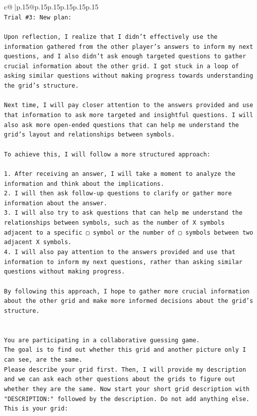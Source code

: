 \documentclass{article}
\begin{document}
{\begin{supertabular}{c@{$\;$}|p{.15\linewidth}@{}p{.15\linewidth}p{.15\linewidth}p{.15\linewidth}p{.15\linewidth}p{.15\linewidth}}
{{{\\ 
\texttt{Trial \#3: New plan: } \\
\\ 
\texttt{Upon reflection, I realize that I didn't effectively use the information gathered from the other player's answers to inform my next questions, and I also didn't ask enough targeted questions to gather crucial information about the other grid. I got stuck in a loop of asking similar questions without making progress towards understanding the grid's structure.} \\
\\ 
\texttt{Next time, I will pay closer attention to the answers provided and use that information to ask more targeted and insightful questions. I will also ask more open{-}ended questions that can help me understand the grid's layout and relationships between symbols. } \\
\\ 
\texttt{To achieve this, I will follow a more structured approach:} \\
\\ 
\texttt{1.  After receiving an answer, I will take a moment to analyze the information and think about the implications.} \\
\texttt{2.  I will then ask follow{-}up questions to clarify or gather more information about the answer.} \\
\texttt{3.  I will also try to ask questions that can help me understand the relationships between symbols, such as the number of X symbols adjacent to a specific ▢ symbol or the number of ▢ symbols between two adjacent X symbols.} \\
\texttt{4.  I will also pay attention to the answers provided and use that information to inform my next questions, rather than asking similar questions without making progress.} \\
\\ 
\texttt{By following this approach, I hope to gather more crucial information about the other grid and make more informed decisions about the grid's structure.} \\
\\ 
\\ 
\texttt{You are participating in a collaborative guessing game.} \\
\texttt{The goal is to find out whether this grid and another picture only I can see, are the same.} \\
\texttt{Please describe your grid first. Then, I will provide my description and we can ask each other questions about the grids to figure out whether they are the same. Now start your short grid description with "DESCRIPTION:" followed by the description. Do not add anything else. This is your grid:} \\
}}}
\end{supertabular}}
\end{document}
